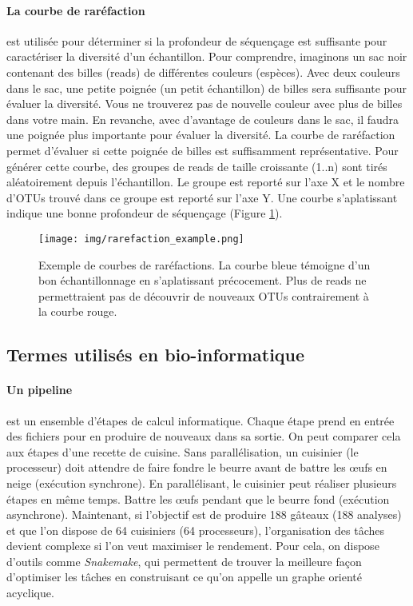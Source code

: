 \documentclass[12pt,a4paper]{article}
\begin{document}
\paragraph{La courbe de raréfaction} est utilisée pour déterminer si la profondeur de séquençage est suffisante pour caractériser la diversité d’un échantillon. Pour comprendre, imaginons un sac noir contenant des billes (reads) de différentes couleurs (espèces). Avec deux couleurs dans le sac, une petite poignée (un petit échantillon) de billes sera suffisante pour évaluer la diversité. Vous ne trouverez pas de nouvelle couleur avec plus de billes dans votre main. En revanche, avec d'avantage de couleurs dans le sac, il faudra une poignée plus importante pour évaluer la diversité. La courbe de raréfaction permet d'évaluer si cette poignée de billes est suffisamment représentative.
Pour générer cette courbe, des groupes de reads de taille croissante (1..n) sont tirés aléatoirement depuis l'échantillon. Le groupe est reporté sur l'axe X et le nombre d'OTUs trouvé dans ce groupe est reporté sur l’axe Y. %
Une courbe s’aplatissant indique une bonne profondeur de séquençage (Figure \ref{rarefaction_demo}).


\begin{figure}[ht]
\begin{center}
\texttt{[image: img/rarefaction\_example.png]}\hfill
\end{center}
\caption{Exemple de courbes de raréfactions. La courbe bleue témoigne d'un bon échantillonnage en s’aplatissant précocement. Plus de reads ne permettraient pas de découvrir de nouveaux OTUs contrairement à la courbe rouge. }
\label{rarefaction_demo}
\end{figure}

\subsection{Termes utilisés en bio-informatique}

\paragraph{Un pipeline} est un ensemble d'étapes de calcul informatique. Chaque étape prend en entrée des fichiers pour en produire de nouveaux dans sa sortie. On peut comparer cela aux étapes d'une recette de cuisine. Sans parallélisation, un cuisinier (le processeur) doit attendre de faire fondre le beurre avant de battre les œufs en neige (exécution synchrone). En parallélisant, le cuisinier peut réaliser plusieurs étapes en même temps. Battre les œufs pendant que le beurre fond (exécution asynchrone).
Maintenant, si l'objectif est de produire 188 gâteaux (188 analyses) et que l'on dispose de 64 cuisiniers (64 processeurs), l'organisation des tâches devient complexe si l'on veut maximiser le rendement. Pour cela, on dispose d'outils comme \textit{Snakemake}\cite{Koster2012}, qui permettent de trouver la meilleure façon d'optimiser les tâches en construisant ce qu'on appelle un graphe orienté acyclique.
\end{document}
